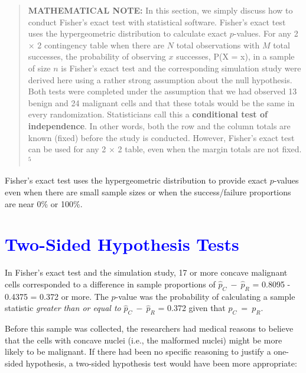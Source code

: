 \documentclass[
]{report}
\begin{document}
\begin{quote}
\textbf{MATHEMATICAL NOTE:} In this section, we simply discuss how to conduct Fisher's exact test with statistical software. Fisher's exact test uses the hypergeometric distribution to calculate exact \(\scriptstyle p\)-values. For any 2 × 2 contingency table when there are \(\scriptstyle N\) total observations with \(\scriptstyle M\) total successes, the probability of observing \(\scriptstyle x\) successes, P(X = x), in a sample of size \(\scriptstyle n\) is Fisher's exact test and the corresponding simulation study were derived here using a rather strong assumption about the null hypothesis. Both tests were completed under the assumption that we had observed 13 benign and 24 malignant cells and that these totals would be the same in every randomization. Statisticians call this a \textbf{conditional test of independence}. In other words, both the row and the column totals are known (fixed) before the study is conducted. However, Fisher's exact test can be used for any 2 \(\scriptstyle \times\) 2 table, even when the margin totals are not fixed.\(^5\)
\end{quote}

Fisher's exact test uses the hypergeometric distribution to provide exact \(\scriptstyle p\)-values even when there are small sample sizes or when the success/failure proportions are near 0\% or 100\%.

\hypertarget{section-52}{%
\section{\texorpdfstring{\textcolor{blue}{Two-Sided Hypothesis Tests}}{}}\label{section-52}}

In Fisher's exact test and the simulation study, 17 or more concave malignant cells corresponded to a difference in sample proportions of \(\scriptstyle \hat p_C \ -\  \hat p_R\) = 0.8095 - 0.4375 = 0.372 or more. The \(\scriptstyle p\)-value was the probability of calculating a sample statistic \emph{greater than or equal to} \(\scriptstyle \hat p_C \ -\  \hat p_R\) = 0.372 given that \(\scriptstyle p_C \ =\  p_R\).

Before this sample was collected, the researchers had medical reasons to believe that the cells with concave nuclei (i.e., the malformed nuclei) might be more likely to be malignant. If there had been no specific reasoning to justify a one-sided hypothesis, a two-sided hypothesis test would have been more appropriate:
\end{document}

